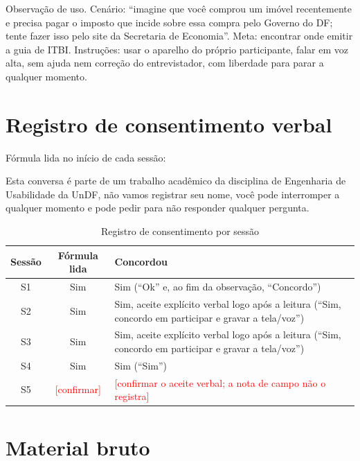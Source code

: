 \documentclass[
  12pt,
  oneside,
  a4paper,
  chapter=TITLE,
  section=TITLE,
  english,
  brazilian
]{abntex2}
\renewcommand{\fonte}[1]{\par\vspace{3pt}{\footnotesize\raggedright\noindent Fonte: #1\par}\vspace{4pt}}%
\renewcommand{\nota}[1]{\par\vspace{2pt}{\footnotesize\raggedright\noindent Nota: #1\par}\vspace{4pt}}%
\newcommand{\preencher}[1]{\textcolor{red}{[#1]}}
\begin{document}
\begin{apendicesenv}
Observação de uso. Cenário: ``imagine que você comprou um imóvel
recentemente e precisa pagar o imposto que incide sobre essa compra pelo Governo
do DF; tente fazer isso pelo site da Secretaria de Economia''. Meta: encontrar
onde emitir a guia de ITBI. Instruções: usar o aparelho do próprio participante,
falar em voz alta, sem ajuda nem correção do entrevistador, com liberdade para
parar a qualquer momento.

\chapter{Registro de consentimento verbal}\label{ap:consentimento}
Fórmula lida no início de cada sessão:

\begin{citacao}
Esta conversa é parte de um trabalho acadêmico da disciplina de Engenharia de
Usabilidade da UnDF, não vamos registrar seu nome, você pode interromper a
qualquer momento e pode pedir para não responder qualquer pergunta.
\end{citacao}

\begin{table}[!htbp]
  \caption{Registro de consentimento por sessão}\label{tab:consentimento}
  \centering\small
  \begin{tabularx}{\textwidth}{ccY}\toprule
    Sessão & Fórmula lida & Concordou \\\midrule
    S1 & Sim & Sim (``Ok'' e, ao fim da observação, ``Concordo'') \\
    S2 & Sim & Sim, aceite explícito verbal logo após a leitura (``Sim, concordo em participar e gravar a tela/voz'') \\
    S3 & Sim & Sim, aceite explícito verbal logo após a leitura (``Sim, concordo em participar e gravar a tela/voz'') \\
    S4 & Sim & Sim (``Sim'') \\
    S5 & \preencher{confirmar} & \preencher{confirmar o aceite verbal; a nota de campo não o registra} \\\bottomrule
  \end{tabularx}
  \fonte{Elaborada pelos autores (2026).}
  \nota{Nas sessões, a fórmula foi dita com variações de redação e com a promessa de uso de pseudônimo. P04 tem 19 anos e é maior de idade, o que dispensa o termo de consentimento de responsável.}
\end{table}

\chapter{Material bruto}\label{ap:material}


\end{apendicesenv}
\end{document}
